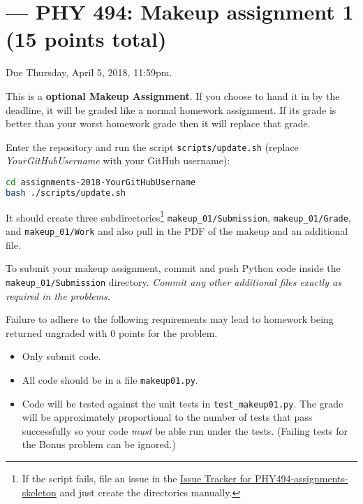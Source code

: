 \documentclass[letterpaper]{scrartcl}
\newcommand{\anumber}{1}
\begin{document}

\setcounter{section}{\anumber}
\addtocounter{section}{-1}
\section{ --- PHY 494: Makeup assignment \anumber{} (15 points total)}

\noindent Due Thursday, April 5, 2018, 11:59pm.

\noindent This is a \textbf{optional Makeup Assignment}. If you choose
to hand it in by the deadline, it will be graded like a normal
homework assignment. If its grade is better than your worst homework
grade then it will replace that grade.

\noindent
{}

Enter the repository and run the script
\texttt{scripts/update.sh} (replace \emph{YourGitHubUsername} with
your GitHub username):
\begin{lstlisting}[language=sh]
cd assignments-2018-YourGitHubUsername
bash ./scripts/update.sh 
\end{lstlisting} 
It should create three subdirectories\footnote{If the script fails,
  file an issue in the
  \href{https://github.com/ASU-CompMethodsPhysics-PHY494/PHY494-assignments-skeleton/issues}{Issue
    Tracker for PHY494-assignments-skeleton} and just create the
  directories manually.} \texttt{makeup\_0\anumber{}/Submission},
\texttt{makeup\_0\anumber{}/Grade}, and
\texttt{makeup\_0\anumber{}/Work} and also pull in the PDF of the
makeup and an additional file.

To submit your makeup assignment, commit and push Python code inside
the \texttt{makeup\_0\anumber{}/Submission} directory. \emph{Commit
  any other additional files exactly as required in the problems.}

Failure to adhere to the following requirements may lead to homework
being returned ungraded with 0 points for the problem.
\begin{itemize}
\item Only submit code.
\item All code should be in a file \texttt{makeup01.py}.
\item Code will be tested against the unit tests in
  \texttt{test\_makeup01.py}. The grade will be approximately
  proportional to the number of tests that pass successfully so your
  code \emph{must} be able run under the tests. (Failing tests for the
  Bonus problem can be ignored.)
\end{itemize}
\end{document}
